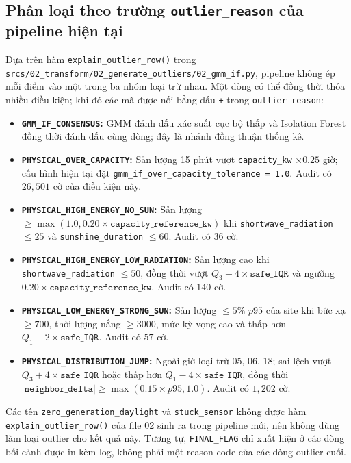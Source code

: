 \documentclass[12pt,a4paper]{article}
\begin{document}
\subsection[Phân loại theo outlier\_reason]{Phân loại theo trường \texttt{outlier\_reason} của pipeline hiện tại}
Dựa trên hàm \texttt{explain\_outlier\_row()} trong \texttt{srcs/02\_transform/02\_generate\_outliers/02\_gmm\_if.py}, pipeline không ép mỗi điểm vào một trong ba nhóm loại trừ nhau. Một dòng có thể đồng thời thỏa nhiều điều kiện; khi đó các mã được nối bằng dấu \texttt{+} trong \texttt{outlier\_reason}:
\begin{itemize}
    \item \textbf{\texttt{GMM\_IF\_CONSENSUS}:} GMM đánh dấu xác suất cục bộ thấp và Isolation Forest đồng thời đánh dấu cùng dòng; đây là nhánh đồng thuận thống kê.
    \item \textbf{\texttt{PHYSICAL\_OVER\_CAPACITY}:} Sản lượng 15 phút vượt \texttt{capacity\_kw} $\times 0.25$ giờ; cấu hình hiện tại đặt \texttt{gmm\_if\_over\_capacity\_tolerance = 1.0}. Audit có $26{,}501$ cờ của điều kiện này.
    \item \textbf{\texttt{PHYSICAL\_HIGH\_ENERGY\_NO\_SUN}:} Sản lượng $\geq \max(1.0, 0.20\times\texttt{capacity\_reference\_kw})$ khi \texttt{shortwave\_radiation} $\leq 25$ và \texttt{sunshine\_duration} $\leq 60$. Audit có $36$ cờ.
    \item \textbf{\texttt{PHYSICAL\_HIGH\_ENERGY\_LOW\_RADIATION}:} Sản lượng cao khi \texttt{shortwave\_radiation} $\leq 50$, đồng thời vượt $Q_3 + 4\times\texttt{safe\_IQR}$ và ngưỡng $0.20\times\texttt{capacity\_reference\_kw}$. Audit có $140$ cờ.
    \item \textbf{\texttt{PHYSICAL\_LOW\_ENERGY\_STRONG\_SUN}:} Sản lượng $\leq 5\%$ $p95$ của site khi bức xạ $\geq 700$, thời lượng nắng $\geq 3000$, mức kỳ vọng cao và thấp hơn $Q_1 - 2\times\texttt{safe\_IQR}$. Audit có $57$ cờ.
    \item \textbf{\texttt{PHYSICAL\_DISTRIBUTION\_JUMP}:} Ngoài giờ loại trừ 05, 06, 18; sai lệch vượt $Q_3 + 4\times\texttt{safe\_IQR}$ hoặc thấp hơn $Q_1 - 4\times\texttt{safe\_IQR}$, đồng thời $|\texttt{neighbor\_delta}| \geq \max(0.15\times p95, 1.0)$. Audit có $1{,}202$ cờ.
\end{itemize}
Các tên \texttt{zero\_generation\_daylight} và \texttt{stuck\_sensor} không được hàm \texttt{explain\_outlier\_row()} của file 02 sinh ra trong pipeline mới, nên không dùng làm loại outlier cho kết quả này. Tương tự, \texttt{FINAL\_FLAG} chỉ xuất hiện ở các dòng bối cảnh được in kèm log, không phải một reason code của các dòng outlier cuối.
\end{document}
